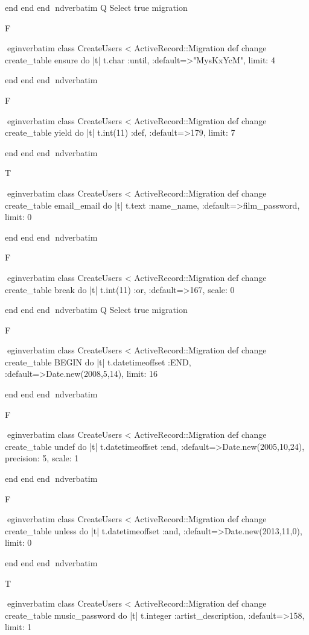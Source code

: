     end 
  end 
end
nd{verbatim}
Q
 Select true migration

F

egin{verbatim}
 class CreateUsers < ActiveRecord::Migration 
  def change 
    create_table ensure do |t| 
      t.char :until, :default=>"MysKxYcM", limit: 4
    
    end 
  end 
end
nd{verbatim}

F

egin{verbatim}
 class CreateUsers < ActiveRecord::Migration 
  def change 
    create_table yield do |t| 
      t.int(11) :def, :default=>179, limit: 7
    
    end 
  end 
end
nd{verbatim}

T

egin{verbatim}
 class CreateUsers < ActiveRecord::Migration 
  def change 
    create_table email_email do |t| 
      t.text :name_name, :default=>film_password, limit: 0
    
    end 
  end 
end
nd{verbatim}

F

egin{verbatim}
 class CreateUsers < ActiveRecord::Migration 
  def change 
    create_table break do |t| 
      t.int(11) :or, :default=>167, scale: 0
    
    end 
  end 
end
nd{verbatim}
Q
 Select true migration

F

egin{verbatim}
 class CreateUsers < ActiveRecord::Migration 
  def change 
    create_table BEGIN do |t| 
      t.datetimeoffset :END, :default=>Date.new(2008,5,14), limit: 16
    
    end 
  end 
end
nd{verbatim}

F

egin{verbatim}
 class CreateUsers < ActiveRecord::Migration 
  def change 
    create_table undef do |t| 
      t.datetimeoffset :end, :default=>Date.new(2005,10,24), precision: 5, scale: 1
    
    end 
  end 
end
nd{verbatim}

F

egin{verbatim}
 class CreateUsers < ActiveRecord::Migration 
  def change 
    create_table unless do |t| 
      t.datetimeoffset :and, :default=>Date.new(2013,11,0), limit: 0
    
    end 
  end 
end
nd{verbatim}

T

egin{verbatim}
 class CreateUsers < ActiveRecord::Migration 
  def change 
    create_table music_password do |t| 
      t.integer :artist_description, :default=>158, limit: 1
    
